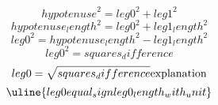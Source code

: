 \[ {hypotenuse}^{2}={leg0}^{2}+{leg1}^{2} \]
\[ {hypotenuse_length}^{2}={leg0}^{2}+{leg1_length}^{2} \]
\[ {leg0}^{2}={hypotenuse_length}^{2}-{leg1_length}^{2} \]
\[ {leg0}^{2}={squares_difference} \]
\[ {leg0}=\sqrt{\mathstrut {squares_difference}}\text{{explanation}}\]
\[ \uline{{leg0}{equal_sign}{leg0_length_with_unit}}\]